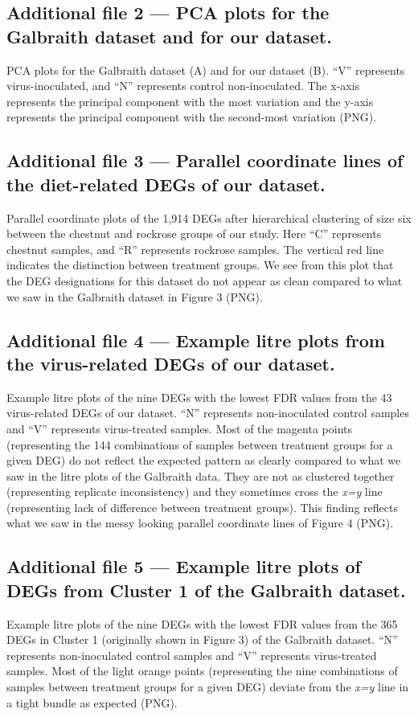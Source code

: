 \documentclass{bmcart}
\begin{document}
\begin{linenumbers}
\begin{backmatter}
  \subsection*{Additional file 2 --- PCA plots for the Galbraith dataset and for our dataset.}
    PCA plots for the Galbraith dataset (A) and for our dataset (B). ``V'' represents virus-inoculated, and ``N'' represents control non-inoculated. The x-axis represents the principal component with the most variation and the y-axis represents the principal component with the second-most variation (PNG).

  \subsection*{Additional file 3 --- Parallel coordinate lines of the diet-related DEGs of our dataset.}
    Parallel coordinate plots of the 1,914 DEGs after hierarchical clustering of size six between the chestnut and rockrose groups of our study. Here ``C'' represents chestnut samples, and ``R'' represents rockrose samples. The vertical red line indicates the distinction between treatment groups. We see from this plot that the DEG designations for this dataset do not appear as clean compared to what we saw in the Galbraith dataset in Figure 3 (PNG).

  \subsection*{Additional file 4 --- Example litre plots from the virus-related DEGs of our dataset.}
    Example litre plots of the nine DEGs with the lowest FDR values from the 43 virus-related DEGs of our dataset. ``N'' represents non-inoculated control samples and ``V'' represents virus-treated samples. Most of the magenta points (representing the 144 combinations of samples between treatment groups for a given DEG) do not reflect the expected pattern as clearly compared to what we saw in the litre plots of the Galbraith data. They are not as clustered together (representing replicate inconsistency) and they sometimes cross the \textit{x=y} line (representing lack of difference between treatment groups). This finding reflects what we saw in the messy looking parallel coordinate lines of Figure 4 (PNG).

  \subsection*{Additional file 5 --- Example litre plots of DEGs from Cluster 1 of the Galbraith dataset.}
    Example litre plots of the nine DEGs with the lowest FDR values from the 365 DEGs in Cluster 1 (originally shown in Figure 3) of the Galbraith dataset. ``N'' represents non-inoculated control samples and ``V'' represents virus-treated samples. Most of the light orange points (representing the nine combinations of samples between treatment groups for a given DEG) deviate from the \textit{x=y} line in a tight bundle as expected (PNG).


\end{backmatter}
\end{linenumbers}
\end{document}
